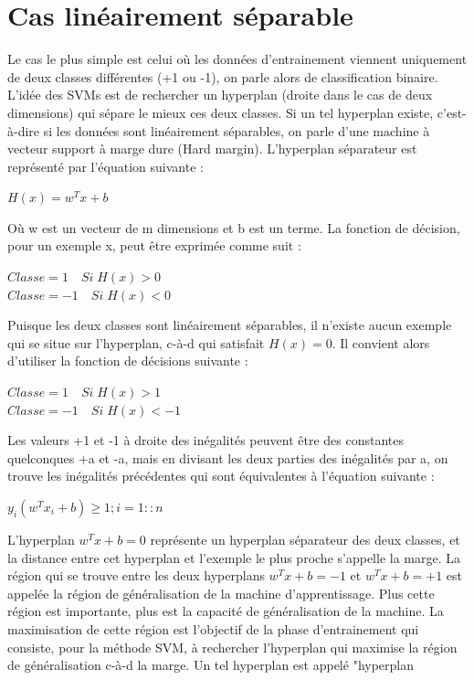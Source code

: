 \documentclass[12pt,a4paper]{report}
\begin{document}
	\section{Cas linéairement séparable}
	Le cas le plus simple est celui où les données d’entrainement viennent uniquement de
	deux classes différentes (+1 ou -1), on parle alors de classification binaire. L’idée des SVMs
	est de rechercher un hyperplan (droite dans le cas de deux dimensions) qui sépare le mieux
	ces deux classes. Si un tel hyperplan existe, c’est-à-dire si les données sont linéairement
	séparables, on parle d’une machine à vecteur support à marge dure (Hard margin).
	L’hyperplan séparateur est représenté par l’équation suivante :\begin{center}
	$ 	H(x) = w^{T} x + b $
	\end{center}
	Où w est un vecteur de m dimensions et b est un terme. La fonction de décision, pour un
	exemple x, peut être exprimée comme suit :
	\begin{center}
		$ Classe = 1 \quad Si\; H(x) > 0 $\\
		$ Classe = -1 \quad Si\; H(x) < 0 $
	\end{center}
Puisque les deux classes sont linéairement séparables, il n’existe aucun exemple qui se
situe sur l’hyperplan, c-à-d qui satisfait $ H(x) = 0 $. Il convient alors d’utiliser la fonction
de décisions suivante :
\begin{center}
	$ Classe = 1 \quad Si\; H(x) > 1 $\\
$ 	Classe = -1 \quad Si\; H(x) < -1 $
\end{center}
Les valeurs +1 et -1 à droite des inégalités peuvent être des constantes quelconques +a et
-a, mais en divisant les deux parties des inégalités par a, on trouve les inégalités précédentes
qui sont équivalentes à l’équation suivante :\begin{center}
	$ y_{i}(w^{T} x_{i} + b) \geq 1; i = 1::n $
\end{center}
L’hyperplan $ w^{T} x+b = 0 $ représente un hyperplan séparateur des deux classes, et la distance
entre cet hyperplan et l’exemple le plus proche s’appelle la marge. La région qui se trouve entre les deux hyperplans $ w^{T} x + b = -1 $ et $ w^{T} x + b = +1 $ est appelée la région de
généralisation de la machine d’apprentissage. Plus cette région est importante, plus est la
capacité de généralisation de la machine. La maximisation de cette région est l’objectif de
la phase d’entrainement qui consiste, pour la méthode SVM, à rechercher l’hyperplan qui
maximise la région de généralisation c-à-d la marge. Un tel hyperplan est appelé "hyperplan
\end{document}
